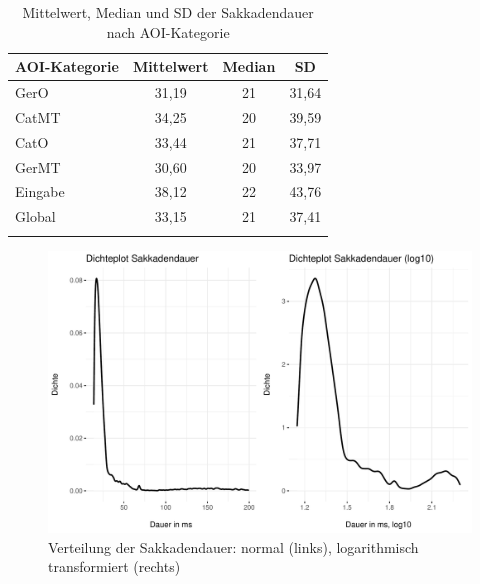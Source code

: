 
\begin{table}
    \begin{tabular}{lccc} 
    \lsptoprule
        {AOI-Kategorie} & {Mittelwert} & {Median} & {SD} \\ 
        \midrule
        GerO   & 31,19 & 21 & 31,64 \\ 
        CatMT   & 34,25 & 20 & 39,59\\ 
        CatO    & 33,44 & 21 & 37,71\\ 
        GerMT  & 30,60 & 20 & 33,97\\ 
        Eingabe  & 38,12 & 22 & 43,76\\ 
        \midrule
        Global  & 33,15 & 21 & 37,41\\ 
        \lspbottomrule
    \end{tabular}
    \caption[Mittelwert, Median und SD der Sakkadendauer]
            {Mittelwert, Median und SD der Sakkadendauer nach AOI-Kategorie\label{K6:tab:CatDe:sacdur}}
\end{table}



\begin{figure}
    \includegraphics[width=\textwidth]{Figures/EyeTracking/CatDe/ggplot_CatDe-SacDur_density_de}
	\caption{Verteilung der Sakkadendauer: normal (links), logarithmisch transformiert (rechts)}
	\label{K6:fig:CatDe:sacdur-density}
\end{figure}


